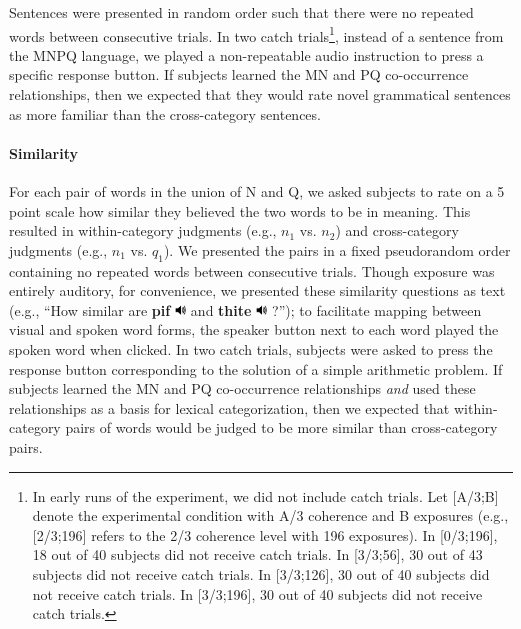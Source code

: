 \documentclass[man,floatsintext]{apa6}
\begin{document}
Sentences were presented in random order such that there were no repeated words between consecutive trials. In two catch trials\footnote{In early runs of the experiment, we did not include catch trials. 
  Let [A/3;B] denote the experimental condition with A/3 coherence and B exposures (e.g., [2/3;196] refers to the 2/3 coherence level with 196 exposures). In [0/3;196], 18 out of 40 subjects did not receive catch trials. In [3/3;56], 30 out of 43 subjects did not receive catch trials. In [3/3;126], 30 out of 40 subjects did not receive catch trials. In [3/3;196], 30 out of 40 subjects did not receive catch trials.}, instead of a sentence from the MNPQ language, we played a non-repeatable audio instruction to press a specific response button.  If subjects learned the MN and PQ co-occurrence relationships, then we expected that they would rate novel grammatical sentences as more familiar than the cross-category sentences.

\paragraph{Similarity}
For each pair of words in the union of N and Q, we asked subjects to rate on a 5 point scale how similar they believed the two words to be in meaning. This resulted in within-category judgments (e.g., $n_1$ vs. $n_2$) and cross-category judgments (e.g., $n_1$ vs. $q_1$).	We presented the pairs in a fixed pseudorandom order containing no repeated words between consecutive trials. Though exposure was entirely auditory, for convenience, we presented these similarity questions as text (e.g., ``How similar are \textbf{pif} \includegraphics[width=0.3cm]{play.png} and \textbf{thite} \includegraphics[width=0.3cm]{play.png} ?''); to facilitate mapping between visual and spoken word forms, the speaker button next to each word played the spoken word when clicked. In two catch trials, subjects were asked to press the response button corresponding to the solution of a simple arithmetic problem. If subjects learned the MN and PQ co-occurrence relationships \emph{and} used these relationships as a basis for lexical categorization, then we expected that within-category pairs of words would be judged to be more similar than cross-category pairs.
\end{document}
